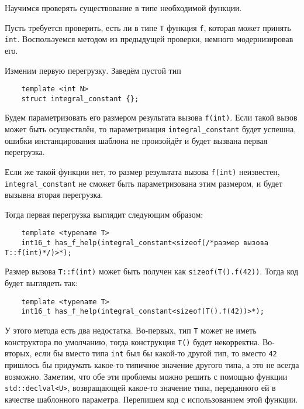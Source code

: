	\vspace{\baselineskip}	
	Научимся проверять существование в типе необходимой функции.
	
	Пусть требуется проверить, есть ли в типе \texttt{T} функция \texttt{f}, которая может принять \texttt{int}. Воспользуемся методом из предыдущей проверки, немного модернизировав его.

	Изменим первую перегрузку. Заведём пустой тип

	\begin{verbatim}
	template <int N>
	struct integral_constant {};
	\end{verbatim}
	
	Будем параметризовать его размером результата вызова \texttt{f(int)}. Если такой вызов может быть осуществлён, то параметризация \texttt{integral_constant} будет успешна, ошибки инстанцирования шаблона не произойдёт и будет вызвана первая перегрузка.
	
	 Если же такой функции нет, то размер результата вызова \texttt{f(int)} неизвестен, \texttt{integral_constant} не сможет быть параметризована этим размером, и будет вызывна вторая перегрузка.
	 
	 Тогда первая перегрузка выглядит следующим образом:
	  
	\begin{verbatim}
	template <typename T>
	int16_t has_f_help(integral_constant<sizeof(/*размер вызова T::f(int)*/)>*);
	\end{verbatim}
	
	Размер вызова \texttt{T::f(int)} может быть получен как \texttt{sizeof(T().f(42))}. Тогда код будет выглядеть так:
	
	\begin{verbatim}
	template <typename T>
	int16_t has_f_help(integral_constant<sizeof(T().f(42))>*);
	\end{verbatim}
	
	У этого метода есть два недостатка. Во-первых, тип \texttt{T} может не иметь конструктора по умолчанию, тогда конструкция \texttt{T()} будет некорректна. Во-вторых, если бы вместо типа \texttt{int} был бы какой-то другой тип, то вместо \texttt{42} пришлось бы придумать какое-то типичное значение другого типа, а это не всегда возможно. Заметим, что обе эти проблемы можно решить с помощью функции \texttt{std::declval<U>}, возвращающей какое-то значение типа, переданного ей в качестве шаблонного параметра. Перепишем код с использованием этой функции.

